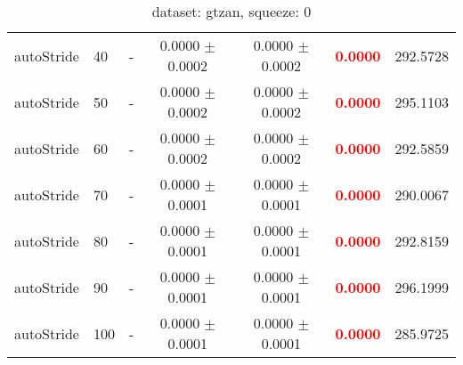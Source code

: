 \begin{table}
\begin{center}
\begin{tabular}{llccccc}
autoStride &  40 & - & 0.0000 $\pm$0.0002 & 0.0000 $\pm$0.0002 & \textbf{\textcolor{red}{0.0000}} & 292.5728 \\ 
autoStride &  50 & - & 0.0000 $\pm$0.0002 & 0.0000 $\pm$0.0002 & \textbf{\textcolor{red}{0.0000}} & 295.1103 \\ 
autoStride &  60 & - & 0.0000 $\pm$0.0002 & 0.0000 $\pm$0.0002 & \textbf{\textcolor{red}{0.0000}} & 292.5859 \\ 
autoStride &  70 & - & 0.0000 $\pm$0.0001 & 0.0000 $\pm$0.0001 & \textbf{\textcolor{red}{0.0000}} & 290.0067 \\ 
autoStride &  80 & - & 0.0000 $\pm$0.0001 & 0.0000 $\pm$0.0001 & \textbf{\textcolor{red}{0.0000}} & 292.8159 \\ 
autoStride &  90 & - & 0.0000 $\pm$0.0001 & 0.0000 $\pm$0.0001 & \textbf{\textcolor{red}{0.0000}} & 296.1999 \\ 
autoStride & 100 & - & 0.0000 $\pm$0.0001 & 0.0000 $\pm$0.0001 & \textbf{\textcolor{red}{0.0000}} & 285.9725 \\ 
\end{tabular} 
\end{center} 
\caption{dataset: gtzan, squeeze: 0} 
\label{dagtSq0} 
\end{table} 
 
